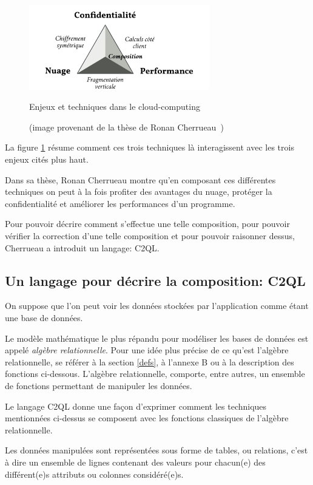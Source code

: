 \begin{figure}
	\begin{center}
		\includegraphics[width=0.7\textwidth]{snps.png}
		\caption{Enjeux et techniques dans le cloud-computing}
		\caption*{(image provenant de la thèse de Ronan Cherrueau~\cite{rc:these})}
		\label{enjeux}
	\end{center}
\end{figure}

La figure \ref{enjeux} résume comment ces trois techniques
là interagissent avec les trois enjeux cités plus haut.

Dans sa thèse, Ronan Cherrueau montre qu'en composant ces différentes techniques
on peut à la fois profiter des avantages du nuage, protéger la confidentialité
et améliorer les performances d'un programme.

Pour pouvoir décrire comment s'effectue une telle composition,
pour pouvoir vérifier la correction d'une telle composition et
pour pouvoir raisonner dessus, Cherrueau a introduit un langage: C2QL.

\subsection{Un langage pour décrire la composition: C2QL}
\label{descrC2QL}
On suppose que l'on peut voir les données stockées par
l'application comme étant une base de données.

Le modèle mathématique le plus répandu pour modéliser
les bases de données est appelé
\emph{algèbre relationnelle}.
Pour une idée plus précise de ce qu'est 
l'algèbre relationnelle, se référer à
la section \ref{defs}, à l'annexe B
ou à la description des fonctions ci-dessous.
L'algèbre relationnelle, comporte, entre
autres, un ensemble de fonctions permettant 
de manipuler les données.

Le langage C2QL donne une façon d'exprimer comment les techniques
mentionnées ci-dessus se composent avec les fonctions classiques de l'algèbre relationnelle.

Les données manipulées sont représentées sous forme de tables, ou relations,
c'est à dire un ensemble de lignes contenant des valeurs pour chacun(e) des 
différent(e)s attributs ou colonnes considéré(e)s.

